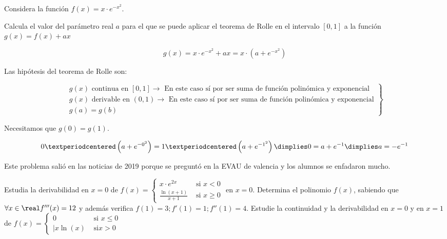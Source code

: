 %

\begin{problem}
Considera la función $f(x) = x·e^{-x^2}$.

Calcula el valor del parámetro real $a$ para el que se puede aplicar el teorema de Rolle en el intervalo $[0,1]$ a la función $g(x) = f(x) + ax$
\solution

\[g(x) = x·e^{-x^2} + ax = x·\left(a+e^{-x^2}\right)\]

Las hipótesis del teorema de Rolle son:

\[
\left.
	\begin{array}{l}
		g(x)\text{ continua en } [0,1] \to \text{ En este caso sí por ser suma de función polinómica y exponencial}\\
		g(x)\text{ derivable en } (0,1) \to \text{ En este caso sí por ser suma de función polinómica y exponencial}\\
		g(a)=g(b) 
	\end{array}
\right\}
\]

Necesitamos que $g(0) = g(1)$. 

\[0·\left(a+e^{-0^2}\right) = 1·\left(a+e^{-1^2}\right) \dimplies 0 = a+e^{-1} \dimplies a=-e^{-1}\]

\obs Este problema salió en las noticias de 2019 porque se preguntó en la EVAU de valencia y los alumnos se enfadaron mucho.
\end{problem}

\begin{problem}

\ppart[17.2-MadA] Estudia la derivabilidad en $x=0$ de $f(x) = \begin{cases}\displaystyle x·e^{2x} &\mbox{ si } x<0\\ \displaystyle\frac{\ln(x+1)}{x+1}&\mbox{ si } x\geq 0\end{cases}$ en $x=0$. 
\ppart[16.1-MadB] Determina el polinomio $f(x)$, sabiendo que $\forall x\in\real f'''(x) = 12$ y además verifica $f(1) = 3; f'(1) = 1; f''(1) = 4$.
\ppart[16.1-MadB] Estudie la continuidad y la derivabilidad en $x=0$ y en $x=1$ de $f(x) = \begin{cases} 0& \text{ si } x\leq 0\\|x\ln(x)&\text{ si} x>0\end{cases}$
\solution
\end{problem}

